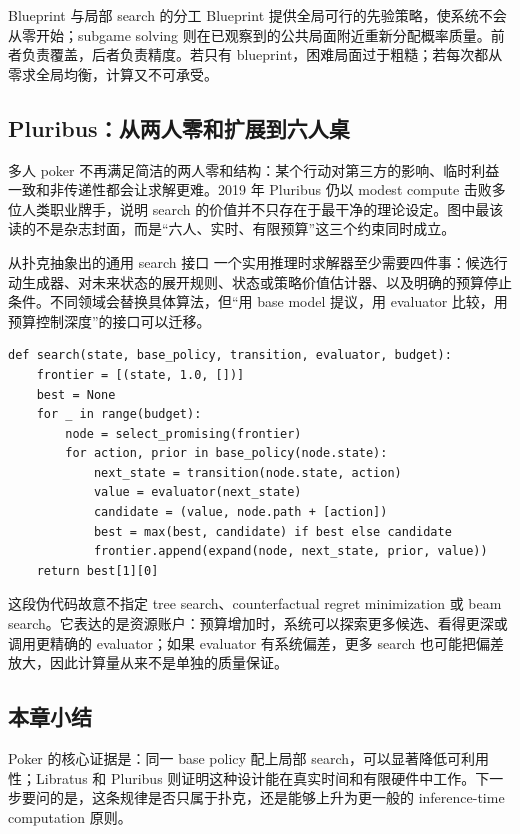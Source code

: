 \begin{importantbox}{Blueprint 与局部 search 的分工}
Blueprint 提供全局可行的先验策略，使系统不会从零开始；subgame solving 则在已观察到的公共局面附近重新分配概率质量。前者负责覆盖，后者负责精度。若只有 blueprint，困难局面过于粗糙；若每次都从零求全局均衡，计算又不可承受。
\end{importantbox}

\subsection{Pluribus：从两人零和扩展到六人桌}

多人 poker 不再满足简洁的两人零和结构：某个行动对第三方的影响、临时利益一致和非传递性都会让求解更难。2019 年 Pluribus 仍以 modest compute 击败多位人类职业牌手，说明 search 的价值并不只存在于最干净的理论设定。图中最该读的不是杂志封面，而是“六人、实时、有限预算”这三个约束同时成立。


\begin{knowledgebox}{从扑克抽象出的通用 search 接口}
一个实用推理时求解器至少需要四件事：候选行动生成器、对未来状态的展开规则、状态或策略价值估计器、以及明确的预算停止条件。不同领域会替换具体算法，但“用 base model 提议，用 evaluator 比较，用预算控制深度”的接口可以迁移。
\end{knowledgebox}

\begin{lstlisting}[caption={Budgeted inference-time search 的领域无关骨架},label={lst:budgeted-search}]
def search(state, base_policy, transition, evaluator, budget):
    frontier = [(state, 1.0, [])]
    best = None
    for _ in range(budget):
        node = select_promising(frontier)
        for action, prior in base_policy(node.state):
            next_state = transition(node.state, action)
            value = evaluator(next_state)
            candidate = (value, node.path + [action])
            best = max(best, candidate) if best else candidate
            frontier.append(expand(node, next_state, prior, value))
    return best[1][0]
\end{lstlisting}

这段伪代码故意不指定 tree search、counterfactual regret minimization 或 beam search。它表达的是资源账户：预算增加时，系统可以探索更多候选、看得更深或调用更精确的 evaluator；如果 evaluator 有系统偏差，更多 search 也可能把偏差放大，因此计算量从来不是单独的质量保证。

\subsection{本章小结}

Poker 的核心证据是：同一 base policy 配上局部 search，可以显著降低可利用性；Libratus 和 Pluribus 则证明这种设计能在真实时间和有限硬件中工作。下一步要问的是，这条规律是否只属于扑克，还是能够上升为更一般的 inference-time computation 原则。

